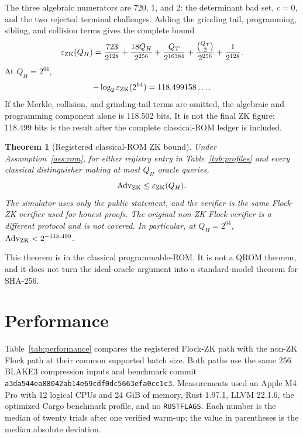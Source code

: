 \documentclass[11pt]{article}
\newtheorem{theorem}{Theorem}
\theoremstyle{definition}
\newcommand{\Adv}{\operatorname{Adv}}
\begin{document}
The three algebraic numerators are $720$, $1$, and $2$: the determinant bad
set, $c=0$, and the two rejected terminal challenges.  Adding the grinding
tail, programming, sibling, and collision terms gives the complete bound
\[
  \varepsilon_{\rm ZK}(Q_H)
  =
  \frac{723}{2^{128}}
  +\frac{18Q_H}{2^{256}}
  +\frac{Q_T}{2^{16384}}
  +\frac{\binom{Q_T}{2}}{2^{256}}
  +\frac{1}{2^{128}}.
\]
At $Q_H=2^{64}$,
\[
  -\log_2\varepsilon_{\rm ZK}(2^{64})
  =118.499158\ldots.
\]
If the Merkle, collision, and grinding-tail terms are omitted, the algebraic
and programming component alone is 118.502 bits.  It is not the final ZK
figure; 118.499 bits is the result after the complete classical-ROM ledger is
included.

\begin{theorem}[Registered classical-ROM ZK bound]\label{thm:zk}
Under Assumption~\ref{ass:rom}, for either registry entry in
Table~\ref{tab:profiles} and every classical distinguisher making at most $Q_H$
oracle queries,
\[
  \Adv_{\rm ZK}
  \le \varepsilon_{\rm ZK}(Q_H).
\]
The simulator uses only the public statement, and the verifier is the same
Flock-ZK verifier used for honest proofs.  The original non-ZK Flock verifier
is a different protocol and is not covered.  In particular, at $Q_H=2^{64}$,
$\Adv_{\rm ZK}<2^{-118.499}$.
\end{theorem}

This theorem is in the classical programmable-ROM.  It is not a QROM theorem,
and it does not turn the ideal-oracle argument into a standard-model theorem
for SHA-256.

\section{Performance}\label{sec:performance}

Table~\ref{tab:performance} compares the registered Flock-ZK path with the
non-ZK Flock path at their common supported batch size.  Both paths use the same
256 BLAKE3 compression inputs and benchmark commit
\texttt{a3da544ea88042ab14e69cdf0dc5663efa0cc1c3}.  Measurements used an Apple
M4 Pro with 12 logical CPUs and 24 GiB of memory, Rust 1.97.1, LLVM 22.1.6,
the optimized Cargo benchmark profile, and no \texttt{RUSTFLAGS}.  Each number
is the median of twenty trials after one verified warm-up; the value in
parentheses is the median absolute deviation.
\end{document}
